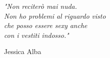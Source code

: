 \newlength\longest

\clearpage

\thispagestyle{empty}
\null\vfill

\settowidth{}
\begin{center}
    \parbox{\longest}{%
        \raggedright{\LARGE\itshape%
            "Non reciterò mai nuda.\\
            Non ho problemi al riguardo visto\\
            che posso essere sexy anche\\
            con i vestiti indosso."\par\bigskip
        }
        \raggedleft\Large{Jessica Alba}\par%
    }
\end{center}


\vfill\vfill

\clearpage

